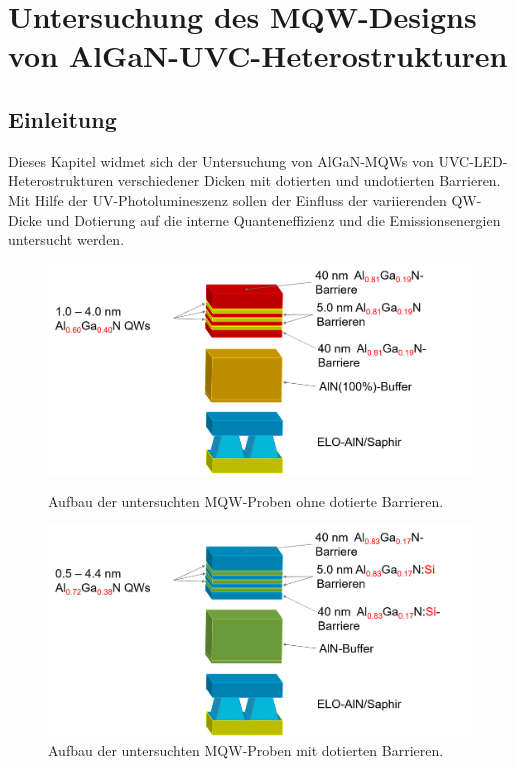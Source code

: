 \thispagestyle{fancy}
\justifying
\chapter{Untersuchung des MQW-Designs von AlGaN-UVC-Heterostrukturen}
\label{chap:mqw}
\section{Einleitung}
Dieses Kapitel widmet sich der Untersuchung von AlGaN-MQWs von UVC-LED-Heterostrukturen verschiedener Dicken mit dotierten und undotierten Barrieren. Mit Hilfe der UV-Photolumineszenz sollen der Einfluss der variierenden QW-Dicke und Dotierung auf die interne Quanteneffizienz und die Emissionsenergien untersucht werden. 
\begin{figure}[H]
  \centering
  \begin{minipage}[t]{0.45\textwidth}
    \centering
    \includegraphics[width=\textwidth]{Bilder/MQWdickenSerie/undotiert}
		\caption{Aufbau der untersuchten MQW-Proben ohne dotierte Barrieren.}
    \label{fig:undotiert}
  \end{minipage}
	\hfill
  \begin{minipage}[t]{0.45\textwidth}
    \centering
    \includegraphics[width=\linewidth]{Bilder/MQWdickenSerie/dotiert}
		\caption{Aufbau der untersuchten MQW-Proben mit dotierten Barrieren.}
    \label{fig:dotiert}
  \end{minipage}
\end{figure}
